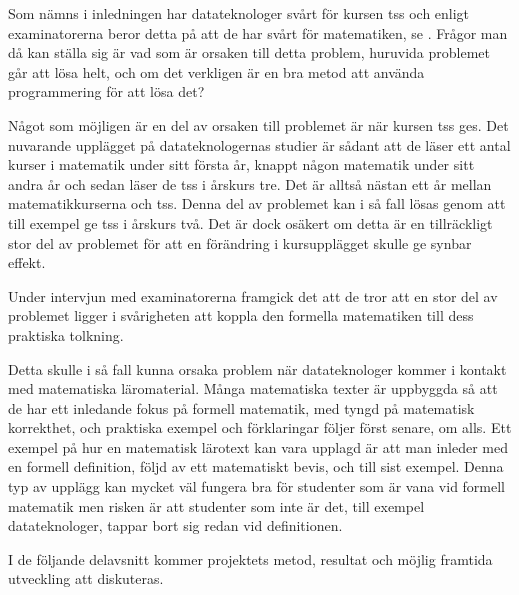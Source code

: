 \documentclass[12pt,a4paper,twoside,openright]{article}
\begin{document}


Som nämns i inledningen har datateknologer svårt för kursen
\gls{tss} och enligt examinatorerna beror detta på att de har svårt för 
matematiken, se . Frågor man då
kan ställa sig är vad som är orsaken till detta problem, huruvida
problemet går att lösa helt, och om det verkligen är en bra metod att
använda programmering för att lösa det?

Något som möjligen är en del av orsaken till problemet är när kursen
\gls{tss} ges. Det nuvarande upplägget på datateknologernas studier
är sådant att de läser ett antal kurser i matematik under sitt första
år, knappt någon matematik under sitt andra år och sedan läser de
\gls{tss} i årskurs tre. Det är alltså nästan ett år mellan
matematikkurserna och \gls{tss}. Denna del av problemet kan i så
fall lösas genom att till exempel ge \gls{tss} i årskurs två. Det är dock
osäkert om detta är en tillräckligt stor del av problemet för att en
förändring i kursupplägget skulle ge synbar effekt.

Under intervjun med examinatorerna
framgick det att de tror att en stor del av problemet ligger i
svårigheten att koppla den formella matematiken till dess praktiska
tolkning.

Detta skulle i så fall kunna orsaka problem när datateknologer kommer
i kontakt med matematiska läromaterial. Många matematiska texter är
uppbyggda så att de har ett inledande fokus på formell matematik, med
tyngd på matematisk korrekthet, och praktiska exempel och förklaringar
följer först senare, om alls. Ett exempel på hur en matematisk
lärotext kan vara upplagd är att man inleder med en formell
definition, följd av ett matematiskt bevis, och till sist
exempel. Denna typ av upplägg kan mycket väl fungera bra för studenter
som är vana vid formell matematik men risken är att studenter som inte
är det, till exempel datateknologer, tappar bort sig redan vid
definitionen.

I de följande delavsnitt kommer projektets metod, resultat och möjlig
framtida utveckling att diskuteras.
\end{document}
